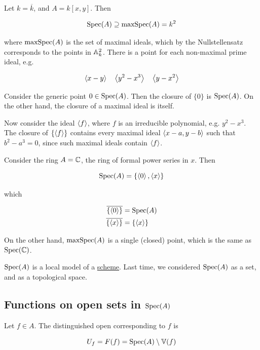 \documentclass{article}
\newcommand{\set}[1]{\left\{#1\right\}}
\begin{document}
\begin{example}
    Let \(k = \overline k\), and \(A = k[x, y]\). Then
    
    \[\operatorname{Spec}(A) \supseteq \operatorname{maxSpec}(A) = k^2\]

    where \(\operatorname{maxSpec}(A)\) is the set of maximal ideals, which by the Nullstellensatz corresponds to the points in \(\mathbb{A}_{k}^{2}\). There is a point for each non-maximal prime ideal, e.g.

    \[\left\langle x - y \right\rangle \quad \left\langle y^2 - x^3 \right\rangle\quad\left\langle y-x^2 \right\rangle\]

    Consider the generic point \(0 \in \operatorname{Spec}(A)\). Then the closure of \(\{0\}\) is \(\operatorname{Spec}(A)\). On the other hand, the closure of a maximal ideal is itself.

    Now consider the ideal \(\left\langle f \right\rangle\), where \(f\) is an irreducible polynomial, e.g. \(y^2 - x^3\). The closure of \(\{\left\langle f \right\rangle\}\) contains every maximal ideal \(\left\langle x - a, y- b \right\rangle\) such that \(b^2 - a^3 = 0\), since such maximal ideals contain \(\left\langle f \right\rangle\).
\end{example}

Consider the ring \(A = \mathbb{C}\), the ring of formal power series in \(x\). Then

\[\operatorname{Spec}(A) = \left\{\left\langle 0 \right\rangle, \left\langle x \right\rangle\right\}\]

which

\begin{align*}
    \overline{\set{\inner{0}}} &= \Spec(A) \\
    \overline{\set{\inner{x}}} &= \set{\inner{x}}
\end{align*}

On the other hand, \(\operatorname{maxSpec}(A)\) is a single (closed) point, which is the same as \(\operatorname{Spec}(\mathbb{C})\).

\lec

\(\operatorname{Spec}(A)\) is a local model of a \underline{scheme}. Last time, we considered \(\operatorname{Spec}(A)\) as a set, and as a topological space.

\subsection{Functions on open sets in \(\operatorname{Spec}(A)\)}

\begin{definition}
    Let \(f \in A\). The distinguished open corresponding to \(f\) is

    \[U_f = F(f) = \operatorname{Spec}(A) \setminus \mathbb{V}(f)\]
\end{definition}
\end{document}

